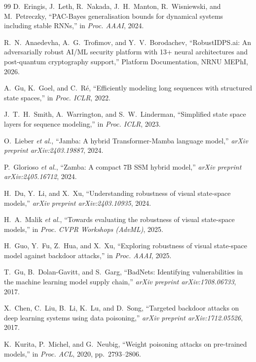\documentclass[journal,a4paper,10pt]{IEEEtran}
\theoremstyle{definition}
\theoremstyle{remark}
\begin{document}
\begin{thebibliography}{99}
D.~Eringis, J.~Leth, R.~Nakada, J.~H.~Manton, R.~Wisniewski, and M.~Petreczky, ``{PAC}-Bayes generalisation bounds for dynamical systems including stable RNNs,'' in \emph{Proc. AAAI}, 2024.


R.~N.~Anaedevha, A.~G.~Trofimov, and Y.~V.~Borodachev, ``{RobustIDPS.ai}: An adversarially robust AI/ML security platform with 13+ neural architectures and post-quantum cryptography support,'' Platform Documentation, NRNU MEPhI, 2026.

A.~Gu, K.~Goel, and C.~R\'e, ``Efficiently modeling long sequences with structured state spaces,'' in \emph{Proc. ICLR}, 2022.

J.~T.~H.~Smith, A.~Warrington, and S.~W.~Linderman, ``Simplified state space layers for sequence modeling,'' in \emph{Proc. ICLR}, 2023.

O.~Lieber \emph{et al.}, ``{Jamba}: A hybrid Transformer-Mamba language model,'' \emph{arXiv preprint arXiv:2403.19887}, 2024.

P.~Glorioso \emph{et al.}, ``{Zamba}: A compact 7B SSM hybrid model,'' \emph{arXiv preprint arXiv:2405.16712}, 2024.

H.~Du, Y.~Li, and X.~Xu, ``Understanding robustness of visual state-space models,'' \emph{arXiv preprint arXiv:2403.10935}, 2024.

H.~A.~Malik \emph{et al.}, ``Towards evaluating the robustness of visual state-space models,'' in \emph{Proc. CVPR Workshops (AdvML)}, 2025.

H.~Guo, Y.~Fu, Z.~Hua, and X.~Xu, ``Exploring robustness of visual state-space model against backdoor attacks,'' in \emph{Proc. AAAI}, 2025.


T.~Gu, B.~Dolan-Gavitt, and S.~Garg, ``{BadNets}: Identifying vulnerabilities in the machine learning model supply chain,'' \emph{arXiv preprint arXiv:1708.06733}, 2017.

X.~Chen, C.~Liu, B.~Li, K.~Lu, and D.~Song, ``Targeted backdoor attacks on deep learning systems using data poisoning,'' \emph{arXiv preprint arXiv:1712.05526}, 2017.

K.~Kurita, P.~Michel, and G.~Neubig, ``Weight poisoning attacks on pre-trained models,'' in \emph{Proc. ACL}, 2020, pp.~2793--2806.


\end{thebibliography}
\end{document}
